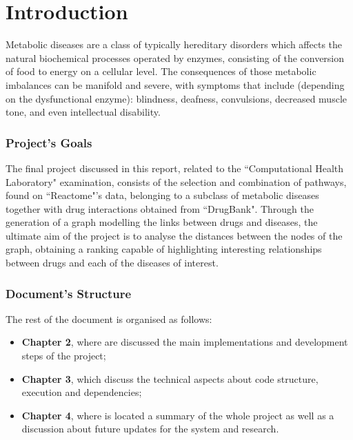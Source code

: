 \chapter{Introduction}

Metabolic diseases are a class of typically hereditary disorders which affects the natural biochemical processes operated by enzymes, consisting of the conversion of food to energy on a cellular level. The consequences of those metabolic imbalances can be manifold and severe, with symptoms that include (depending on the dysfunctional enzyme): blindness, deafness, convulsions, decreased muscle tone, and even intellectual disability\cite{britannica}.

\subsection{Project's Goals}

The final project discussed in this report, related to the ``Computational Health Laboratory" examination, consists of the selection and combination of pathways, found on ``Reactome"\cite{reactome}'s data, belonging to a subclass of metabolic diseases together with drug interactions obtained from ``DrugBank"\cite{drugbank}. Through the generation of a graph modelling the links between drugs and diseases, the ultimate aim of the project is to analyse the distances between the nodes of the graph, obtaining a ranking capable of highlighting interesting relationships between drugs and each of the diseases of interest.

\subsection{Document's Structure}
The rest of the document is organised as follows:
\begin{itemize}
\item \textbf{Chapter 2}, where are discussed the main implementations and development steps of the project;
\item \textbf{Chapter 3}, which discuss the technical aspects about code structure, execution and dependencies;
\item \textbf{Chapter 4}, where is located a summary of the whole project as well as a discussion about future updates for the system and research.
\end{itemize}